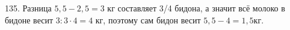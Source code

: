135. Разница $5,5-2,5=3$ кг составляет 3/4 бидона, а значит всё молоко в бидоне весит $3:3\cdot4=4$ кг, поэтому сам бидон весит $5,5-4=1,5$кг.\\

